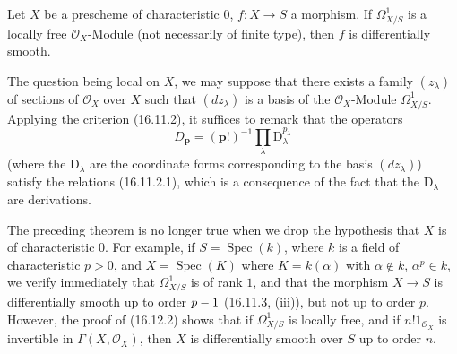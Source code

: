 \begin{theorem}[16.12.2]
\label{IV.16.12.2}
Let $X$ be a prescheme of characteristic $0$, $f:X\to S$ a morphism. If
$\varOmega_{X/S}^1$ is a locally free $\mathcal{O}_X$-Module (not
necessarily of finite type), then $f$ is differentially smooth.
\end{theorem}

The question being local on $X$, we may suppose that there exists a family
$(z_\lambda)$ of sections of $\mathcal{O}_X$ over $X$ such that
$(dz_\lambda)$ is a basis of the $\mathcal{O}_X$-Module $\varOmega_{X/S}^1$.
Applying the criterion (16.11.2), it suffices to remark that the operators
\[
  D_{\mathbf{p}}=(\mathbf{p}!)^{-1}
  \prod_\lambda \mathrm{D}_\lambda^{p_\lambda}
\]
(where the $\mathrm{D}_\lambda$ are the coordinate forms corresponding to the basis
$(dz_\lambda)$) satisfy the relations (16.11.2.1), which is a
consequence of the fact that the $\mathrm{D}_\lambda$ are derivations.

\begin{env}[16.12.3]
\label{IV.16.12.3}
The preceding theorem is no longer true when we drop the hypothesis that
$X$ is of characteristic $0$. For example, if
$S=\operatorname{Spec}(k)$, where $k$ is a field of characteristic $p>0$,
and $X=\operatorname{Spec}(K)$ where $K=k(\alpha)$ with
$\alpha\notin k$, $\alpha^p\in k$, we verify immediately
that $\varOmega_{X/S}^1$ is of rank $1$, and that the morphism $X\to S$ is
differentially smooth up to order $p- 1$ (16.11.3, (iii)), but not
up to order $p$. However, the proof of (16.12.2) shows that if
$\varOmega_{X/S}^1$ is locally free, and if $n!1_{\mathcal{O}_X}$ is
invertible in $\Gamma(X,\mathcal{O}_X)$, then $X$ is differentially
smooth over $S$ up to order $n$.
\end{env}

